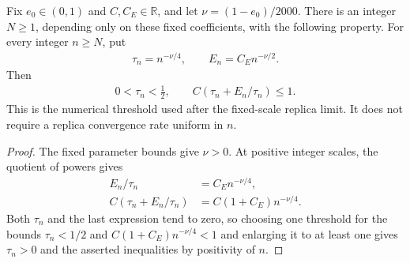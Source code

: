 \begin{lemma}
    \label{thm:area_law_bootstrap_comparison_loss_threshold}
    \leanok
    Fix $e_0\in(0,1)$ and $C,C_E\in\mathbb R$, and let
    $\nu=(1-e_0)/2000$. There is an integer $N\ge1$, depending
    only on these fixed coefficients, with the following property.
    For every integer $n\ge N$, put
    \begin{align}
        \tau_n=n^{-\nu/4},\qquad E_n=C_E n^{-\nu/2}.
    \end{align}
    Then
    \begin{align}
        0<\tau_n<\frac12,\qquad C(\tau_n+E_n/\tau_n)\le1.
    \end{align}
    This is the numerical threshold used after the fixed-scale
    replica limit. It does not require a replica convergence rate
    uniform in $n$.
\end{lemma}
\begin{proof}
    \leanok
    The fixed parameter bounds give $\nu>0$. At positive integer
    scales, the quotient of powers gives
    \begin{align}
        E_n/\tau_n           & =C_E n^{-\nu/4},     \\
        C(\tau_n+E_n/\tau_n) & =C(1+C_E)n^{-\nu/4}.
    \end{align}
    Both $\tau_n$ and the last expression tend to zero, so choosing
    one threshold for the bounds $\tau_n<1/2$ and
    $C(1+C_E)n^{-\nu/4}<1$ and enlarging it to at least one
    gives $\tau_n>0$ and the asserted inequalities by positivity of $n$.
\end{proof}


